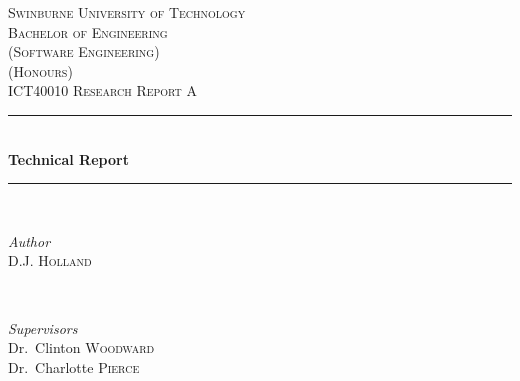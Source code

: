 \usepackage{fontspec}
\newfontface{}
\newcommand{\emoji}[1]{{\emojifont{#1}}}





\begin{titlepage} %
  \newcommand{\HRule}{\rule{\linewidth}{0.5mm}} %

  \center{} %


  \textsc{\LARGE Swinburne University of Technology}\\[1.5cm]

  \textsc{
    \Large
    Bachelor of Engineering\\
    (Software Engineering)\\
    (Honours)
  }\\[0.5cm]

  \textsc{\large ICT40010 Research Report A}\\[0.5cm]


  \HRule{}\\[0.4cm]

  {\huge\bfseries Technical Report}\\[0.2cm]

  \HRule{}\\[1.5cm]


  \begin{minipage}{0.4\textwidth}
    \begin{flushleft}
      \large
      \textit{Author}\\
      D.J. \textsc{Holland}
    \end{flushleft}
  \end{minipage}
  {~}
  \begin{minipage}{0.4\textwidth}
    \begin{flushright}
      \large
      \textit{Supervisors}\\
      Dr.\ Clinton \textsc{Woodward}\\
      Dr.\ Charlotte \textsc{Pierce}
    \end{flushright}
  \end{minipage}


\end{titlepage}
